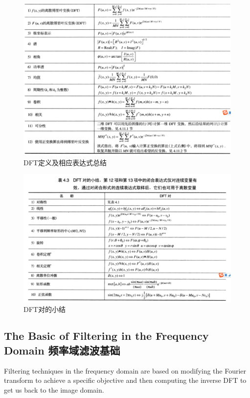 \documentclass[12pt]{article}
\numberwithin{equation}{section}%
\begin{document}
\begin{figure}[!htb] %
\centering
\includegraphics[width=1\textwidth]{DFTsummary.png}
\caption{DFT定义及相应表达式总结}
\label{fig:2}
\end{figure}\newpage

\begin{figure}[!htb] %
\centering
\includegraphics[width=1\textwidth]{summary_of_DFTpairs.png}
\caption{DFT对的小结}
\label{fig:3}
\end{figure}\newpage



\subsection{The Basic of Filtering in the Frequency Domain 频率域滤波基础}

Filtering techniques in the frequency domain are based on modifying the Fourier transform to achieve a specific objective and then computing the inverse DFT to get us back to the image domain.
\end{document}
